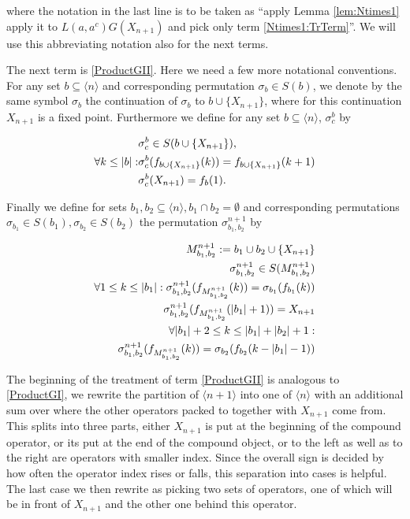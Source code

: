 \documentclass[b5paper,draft,openbib,12pt]{memoir}
\begin{document}
where the notation in the last line is to be taken as ``apply Lemma \ref{lem:Ntimes1} apply it to \(L(a,a^c) G(X_{n+1})\) and
pick only term \eqref{Ntimes1:TrTerm}''. We will use this abbreviating notation also for the next terms.

The next term is \eqref{ProductGII}. Here we need a few more notational conventions. For any  set 
\(b\subseteq \langle n \rangle\) and corresponding
permutation \(\sigma_b\in S(b)\), we denote by the same symbol \(\sigma_b\) the continuation of \(\sigma_b\) to \(b\cup \{X_{n+1}\}\),
where for this continuation \(X_{n+1}\) is a fixed point. Furthermore we define for any set 
\(b\subseteq \langle n \rangle\), \(\sigma_c^b\) by

\begin{align}\notag
&\sigma_c^b \in  S(b\cup\{X_{n+1}\}), \\\notag
\forall k\le |b|: &\sigma_c^b(f_{b\cup \{X_{n+1}\}}(k))=f_{b\cup \{X_{n+1}\}}(k+1)\\
 &\sigma^b_c (X_{n+1})=f_b(1).
\end{align}

Finally we define for sets \(b_1,b_2 \subseteq \langle n \rangle, b_1\cap b_2=\emptyset\) and corresponding
permutations \(\sigma_{b_1}\in S(b_1), \sigma_{b_2} \in S(b_2)\) the permutation 
\(\sigma_{b_1,b_2}^{n+1}\) by

\begin{align}\notag
M_{b_1,b_2}^{n+1} :=b_1\cup b_2 \cup \{X_{n+1}\}\\\notag
\sigma_{b_1,b_2}^{n+1}\in S(M_{b_1,b_2}^{n+1} )\\\notag
\forall 1\le k \le |b_1|: \sigma_{b_1,b_2}^{n+1}(f_{M_{b_1,b_2}^{n+1}}(k))=\sigma_{b_1}(f_{b_1}(k))\\\notag
\sigma_{b_1,b_2}^{n+1}(f_{M_{b_1,b_2}^{n+1}}(|b_1|+1))=X_{n+1}\\\notag
\forall |b_1|+2\le k \le |b_1|+|b_2|+1:\\
 \sigma_{b_1,b_2}^{n+1}(f_{M_{b_1,b_2}^{n+1}}(k))
= \sigma_{b_2} ( f_{b_2}(k-|b_1|-1))
\end{align}

The beginning of the treatment of term \eqref{ProductGII} is analogous to \eqref{ProductGI}, we rewrite the
partition of \(\langle n+1\rangle \) into one of \(\langle n \rangle \) with an additional sum over where the
other operators packed to together with \(X_{n+1}\) come from. This splits into three parts, either \(X_{n+1}\)
is put at the beginning of the compound operator, or its put at the end of the compound object, or 
to the left as well as to the right are operators with smaller index. Since the overall sign is decided by 
how often the operator index rises or falls, this separation into cases is helpful. The last case we then
rewrite as picking two sets of operators, one of which will be in front of \(X_{n+1}\) and the other one
behind this operator. 
\end{document}
